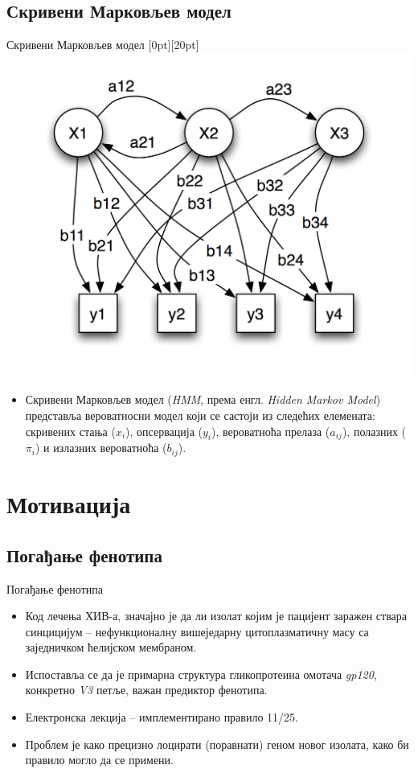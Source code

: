 \documentclass[hyperref={bookmarks=false}]{beamer}
\newcommand{\lenitem}[2][.43\linewidth]{\parbox[t]{#1}{\strut #2\strut}}
\begin{document}
\subsection{Скривени Марковљев модел}
\begin{frame}{Скривени Марковљев модел}
\mbox{}\hfill\raisebox{-\height}[0pt][20pt]{\includegraphics[width=.5\linewidth]{hmm.png}}
\vspace*{-\baselineskip}

\begin{itemize}
\item \lenitem{Скривени Марковљев модел (\textit{HMM}, према енгл. \textit{Hidden Markov Model}) представља вероватносни модел који се састоји из следећих елемената: скривених стања ($x_i$), опсервација ($y_i$), вероватноћа прелаза ($a_{ij}$), полазних ($\pi_i$) и излазних вероватноћа ($b_{ij}$).}
\end{itemize}
\end{frame}

\section{Мотивација}
\subsection{Погађање фенотипа}
\begin{frame}{Погађање фенотипа}
\begin{itemize}
\item Код лечења ХИВ-а, значајно је да ли изолат којим је пацијент заражен ствара синцицијум -- нефункционалну вишеједарну цитоплазматичну масу са заједничком ћелијском мембраном.
\item Испоставља се да је примарна структура гликопротеина омотача \textit{gp120}, конкретно \textit{V3} петље, важан предиктор фенотипа.
\item Електронска лекција -- имплементирано правило 11/25.
\item Проблем је како прецизно лоцирати (поравнати) геном новог изолата, како би правило могло да се примени.
\end{itemize}
\end{frame}
\end{document}
